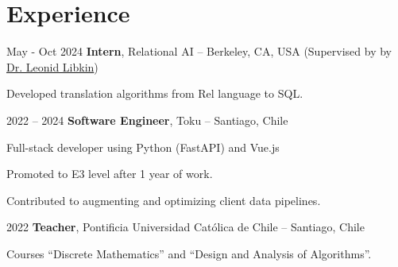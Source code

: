 \section{Experience}

\begin{twocolentry}{
    May - Oct 2024
}
    \textbf{Intern}, Relational AI -- Berkeley, CA, USA {\footnotesize (Supervised by by \href{http://libk.in/}{Dr. Leonid Libkin})}
\end{twocolentry}
\vspace{0.10 cm}
\begin{onecolentry}
    \begin{highlights}
        \item Developed translation algorithms from Rel language to SQL.
    \end{highlights}
\end{onecolentry}
\vspace{0.2 cm}

\begin{twocolentry}{
    2022 – 2024
}
    \textbf{Software Engineer}, Toku -- Santiago, Chile\end{twocolentry}

\vspace{0.10 cm}
\begin{onecolentry}
    \begin{highlights}
        \item Full-stack developer using Python (FastAPI) and Vue.js
        \item Promoted to E3 level after 1 year of work.
        \item Contributed to augmenting and optimizing client data pipelines.
    \end{highlights}
\end{onecolentry}

\vspace{0.2 cm}

\begin{twocolentry}{
    2022
}
    \textbf{Teacher}, Pontificia Universidad Católica de Chile -- Santiago, Chile\end{twocolentry}

\vspace{0.10 cm}
\begin{onecolentry}
    \begin{highlights}
        \item Courses ``Discrete Mathematics'' and ``Design and Analysis of Algorithms''.
    \end{highlights}
\end{onecolentry}

